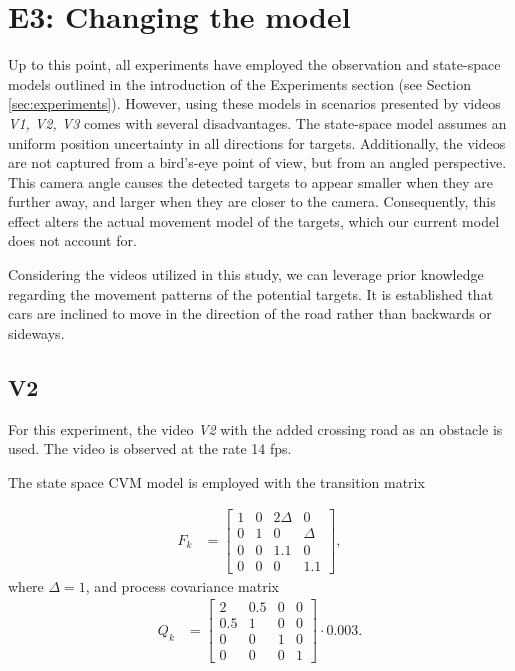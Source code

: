 \section{E3: Changing the model}
\renewcommand{\Ex}{E3}
Up to this point, all experiments have employed the observation and state-space models outlined in the introduction
of the Experiments section (see Section \ref{sec:experiments}). However, using these models in scenarios presented by videos \textit{V1, V2, V3} comes with several disadvantages. The state-space model assumes an uniform position uncertainty in all directions for targets. Additionally, the videos are not captured from a bird's-eye point of view, but from an angled perspective. This camera angle causes the detected targets to appear smaller when they are further away, and larger when they are closer to the camera. Consequently, this effect alters the actual movement model of the targets, which our current model does not account for.


Considering the videos utilized in this study, we can leverage prior knowledge regarding the movement patterns of the potential targets. It is established that cars are inclined to move in the
direction
of the road rather than backwards or sideways.
\subsection{V2}
\renewcommand{\Vs}{V2}
For this experiment, the video \textit{V2} with the added crossing road as an obstacle is used. The video is observed
at the rate 14 fps.

The state space CVM model is employed with the transition matrix

\begin{align}
    F_k &=
    \begin{bmatrix}
        1 & 0 & 2\Delta & 0\\
        0 & 1 & 0 & \Delta \\
        0 & 0 & 1.1 & 0 \\
        0 & 0 & 0 & 1.1
    \end{bmatrix},
\end{align}
where $\Delta = 1$,
and process covariance matrix
\begin{align}
    Q_k &=
    \begin{bmatrix}
        2 & 0.5 & 0 & 0\\
        0.5 & 1 & 0 & 0 \\
        0 & 0 & 1 & 0 \\
        0 & 0 & 0 & 1
    \end{bmatrix}
    \cdot 0.003.
    \label{eq:exp_E3-V2_Q}
\end{align}

